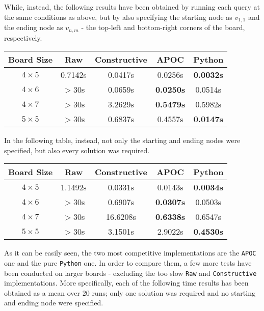\documentclass[conference]{IEEEtran}
\begin{document}
While, instead, the following results have been obtained by running each query at the same conditions as above, but by also specifying the starting node as $v_{1,1}$ and the ending node as $v_{n,m}$ - the top-left and bottom-right corners of the board, respectively.

\begin{table}[ht]
\centering
\begin{tabular}{|c|c c c c |}
\hline
\textbf{Board Size} & \textbf{Raw} & \textbf{Constructive} & \textbf{APOC} & \textbf{Python} \\ \hline
\textbf{$4 \times 5$} & 0.7142s & 0.0417s & 0.0256s & \textbf{0.0032s}  \\ \hline
\textbf{$4 \times 6$} & $>$30s & 0.0659s & \textbf{0.0250s} & 0.0514s \\ \hline
\textbf{$4 \times 7$} & $>$30s & 3.2629s & \textbf{0.5479s} & 0.5982s \\ \hline
\textbf{$5 \times 5$} & $>$30s & 0.6837s & 0.4557s & \textbf{0.0147s} \\ \hline
\end{tabular}
\end{table}

In the following table, instead, not only the starting and ending nodes were specified, but also every solution was required.

\begin{table}[ht]
\centering
\begin{tabular}{|c|c c c c |}
\hline
\textbf{Board Size} & \textbf{Raw} & \textbf{Constructive} & \textbf{APOC} & \textbf{Python} \\ \hline
\textbf{$4 \times 5$} & 1.1492s & 0.0331s & 0.0143s & \textbf{0.0034s} \\ \hline
\textbf{$4 \times 6$} & $>$30s & 0.6907s & \textbf{0.0307s} & 0.0503s \\ \hline
\textbf{$4 \times 7$} & $>$30s & 16.6208s & \textbf{0.6338s} & 0.6547s \\ \hline
\textbf{$5 \times 5$} & $>$30s & 3.1501s & 2.9022s & \textbf{0.4530s} \\ \hline
\end{tabular}
\end{table}

As it can be easily seen, the two most competitive implementations are the \texttt{APOC} one and the pure \texttt{Python} one.
In order to compare them, a few more tests have been conducted on larger boards - excluding the too slow \texttt{Raw} and \texttt{Constructive} implementations.
More specifically, each of the following time results has been obtained as a mean over $20$ runs; only one solution was required and no starting and ending node were specified.
\end{document}
